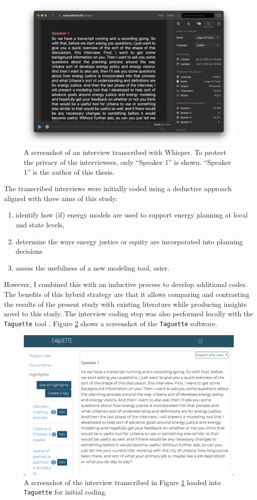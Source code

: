 \begin{figure}[htbp!]
    \centering
    \includegraphics[width=0.75\columnwidth]{figures/07_interview_chapter/whisper-screenshot.png}
    \caption{A screenshot of an interview transcribed with Whisper. To protect
    the privacy of the interviewees, only ``Speaker 1'' is shown. ``Speaker 1''
    is the author of this thesis.}
    \label{fig:whisper}
\end{figure}

The transcribed interviews were initially coded using a deductive approach aligned with three aims of this study:
\begin{enumerate}
    \item identify how (if) energy models are used to support energy planning at
    local and state levels,
    \item determine the ways energy justice or equity are incorporated into
    planning decisions
    \item assess the usefulness of a new modeling tool, \ac{osier}.
\end{enumerate} 
However, I combined this with an inductive process to develop additional codes. The benefits
of this hybrid strategy are that it allows comparing and contrasting the results of the present study with existing
literature while producing insights novel to this study.
The interview coding step was also performed locally with the \texttt{Taguette}
tool \cite{rampin_taguette_2021}. Figure \ref{fig:taguette} shows a screenshot
of the \texttt{Taguette} software.

\begin{figure}[htbp!]
    \centering
    \includegraphics[width=0.75\columnwidth]{figures/07_interview_chapter/taguette-screenshot}
    \caption{A screenshot of the interview transcribed in Figure \ref{fig:whisper}
    loaded into \texttt{Taguette} for initial coding.}
    \label{fig:taguette}
\end{figure}

